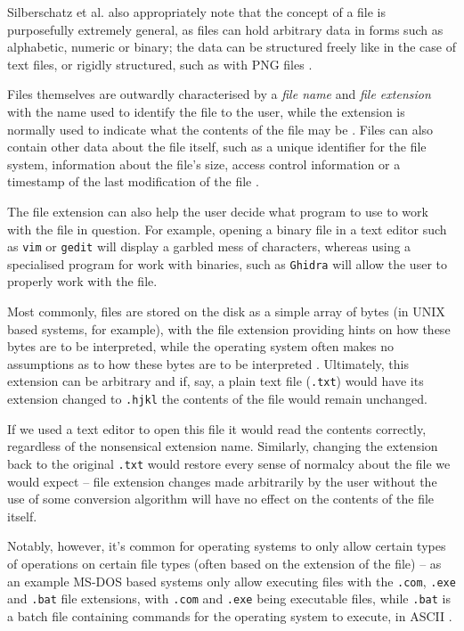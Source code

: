 Silberschatz et al. also appropriately note that the concept of a file is purposefully extremely general, as files can
hold arbitrary data in forms such as alphabetic, numeric or binary; the data can be structured freely like in the case
of text files, or rigidly structured, such as with \acrfull{PNG} files \cite[p.~422]{operating-system-concepts}.

Files themselves are outwardly characterised by a \emph{file name} and \emph{file extension} with the name used to 
identify the file to the user, while the extension is normally used to indicate what the contents of the file may be
\cite[p~.427]{operating-system-concepts}. Files can also contain other data about the file itself, such as a unique
identifier for the file system, information about the file's size, access control information or a timestamp of the
last modification of the file \cite[p.~422]{operating-system-concepts}.

The file extension can also help the user decide what program to use to work with the file in question. 
For example, opening a binary file in a text editor such as \verb+vim+ or \verb+gedit+ will display a garbled mess of
characters, whereas using a specialised program for work with binaries, such as \verb+Ghidra+ will allow the user to
properly work with the file.

Most commonly, files are stored on the disk as a simple array of bytes (in UNIX based systems, for example), with the file 
extension providing hints on how these bytes are to be interpreted, while the operating system often makes no
assumptions as to how these bytes are to be interpreted \cite[p.~428]{operating-system-concepts}. Ultimately, this 
extension can be arbitrary and if, say, a plain text file (\verb+.txt+) would have its extension changed to \verb+.hjkl+ 
the contents of the file would remain unchanged. 

If we used a text editor to open this file it would read the contents correctly, regardless
of the nonsensical extension name. Similarly, changing the extension back to the original \verb+.txt+ would restore every 
sense of normalcy about the file we would expect -- file extension changes made arbitrarily by the user without the use of 
some conversion algorithm will have no effect on the contents of the file itself. 

Notably, however, it's common for operating systems to only allow certain types of operations on certain file types 
(often based on the extension of the file) -- as an example MS-DOS based systems only allow executing files with the 
\verb+.com+, \verb+.exe+ and \verb+.bat+ file extensions, with  \verb+.com+ and \verb+.exe+ being executable files, 
while \verb+.bat+ is a batch file containing commands for the operating system to execute, in ASCII 
\cite[p.~427]{operating-system-concepts}.

